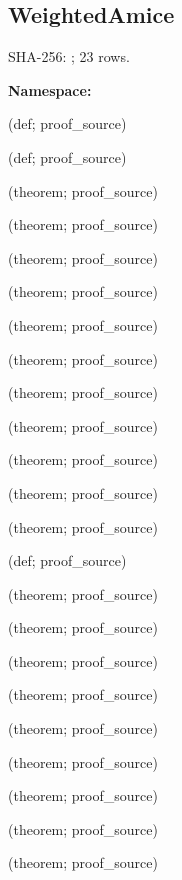 \subsection*{WeightedAmice}
{\footnotesize SHA-256: ; 23 rows.}\par
\begingroup\small
\textbf{Namespace:} \par
\noindent{} {\scriptsize (def; proof\_source)}\par
\noindent{} {\scriptsize (def; proof\_source)}\par
\noindent{} {\scriptsize (theorem; proof\_source)}\par
\noindent{} {\scriptsize (theorem; proof\_source)}\par
\noindent{} {\scriptsize (theorem; proof\_source)}\par
\noindent{} {\scriptsize (theorem; proof\_source)}\par
\noindent{} {\scriptsize (theorem; proof\_source)}\par
\noindent{} {\scriptsize (theorem; proof\_source)}\par
\noindent{} {\scriptsize (theorem; proof\_source)}\par
\noindent{} {\scriptsize (theorem; proof\_source)}\par
\noindent{} {\scriptsize (theorem; proof\_source)}\par
\noindent{} {\scriptsize (theorem; proof\_source)}\par
\noindent{} {\scriptsize (theorem; proof\_source)}\par
\noindent{} {\scriptsize (def; proof\_source)}\par
\noindent{} {\scriptsize (theorem; proof\_source)}\par
\noindent{} {\scriptsize (theorem; proof\_source)}\par
\noindent{} {\scriptsize (theorem; proof\_source)}\par
\noindent{} {\scriptsize (theorem; proof\_source)}\par
\noindent{} {\scriptsize (theorem; proof\_source)}\par
\noindent{} {\scriptsize (theorem; proof\_source)}\par
\noindent{} {\scriptsize (theorem; proof\_source)}\par
\noindent{} {\scriptsize (theorem; proof\_source)}\par
\noindent{} {\scriptsize (theorem; proof\_source)}\par
\endgroup
